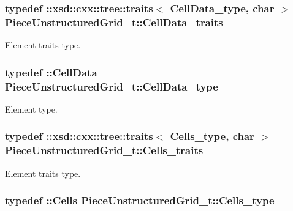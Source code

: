 \subsubsection[{Cell\+Data\+\_\+traits}]{\setlength{\rightskip}{0pt plus 5cm}typedef \+::xsd\+::cxx\+::tree\+::traits$<$ {\bf Cell\+Data\+\_\+type}, char $>$ {\bf Piece\+Unstructured\+Grid\+\_\+t\+::\+Cell\+Data\+\_\+traits}}\label{classPieceUnstructuredGrid__t_a0e04d369c16993da7e5e2a7152c2e518}


Element traits type. 

\hypertarget{classPieceUnstructuredGrid__t_a4232a7b88477ee6f692a4e5fab6a65d1}{}
\subsubsection[{Cell\+Data\+\_\+type}]{\setlength{\rightskip}{0pt plus 5cm}typedef \+::{\bf Cell\+Data} {\bf Piece\+Unstructured\+Grid\+\_\+t\+::\+Cell\+Data\+\_\+type}}\label{classPieceUnstructuredGrid__t_a4232a7b88477ee6f692a4e5fab6a65d1}


Element type. 

\hypertarget{classPieceUnstructuredGrid__t_a33252b6f55b5ae830ceecdf9be42cce1}{}
\subsubsection[{Cells\+\_\+traits}]{\setlength{\rightskip}{0pt plus 5cm}typedef \+::xsd\+::cxx\+::tree\+::traits$<$ {\bf Cells\+\_\+type}, char $>$ {\bf Piece\+Unstructured\+Grid\+\_\+t\+::\+Cells\+\_\+traits}}\label{classPieceUnstructuredGrid__t_a33252b6f55b5ae830ceecdf9be42cce1}


Element traits type. 

\hypertarget{classPieceUnstructuredGrid__t_aca1ec38eff08bde0cd115c54dbb7a20f}{}
\subsubsection[{Cells\+\_\+type}]{\setlength{\rightskip}{0pt plus 5cm}typedef \+::{\bf Cells} {\bf Piece\+Unstructured\+Grid\+\_\+t\+::\+Cells\+\_\+type}}\label{classPieceUnstructuredGrid__t_aca1ec38eff08bde0cd115c54dbb7a20f}


